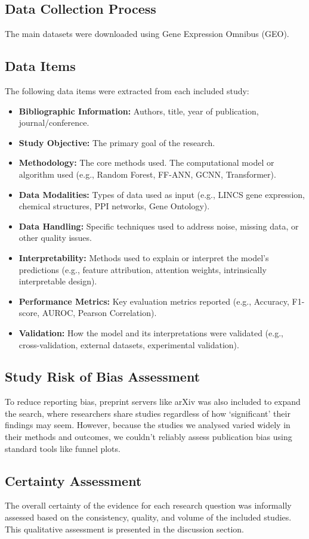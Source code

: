 \documentclass[twocolumn]{article}
\begin{document}
\subsection{Data Collection Process}
The main datasets were downloaded using Gene Expression Omnibus (GEO). 

\subsection{Data Items}
The following data items were extracted from each included study:
\begin{itemize}
    \item \textbf{Bibliographic Information: }Authors, title, year of publication, journal/conference.
    \item \textbf{Study Objective: }The primary goal of the research.
    \item \textbf{Methodology: }The core methods used. The computational model or algorithm used (e.g., Random Forest, FF-ANN, GCNN, Transformer).
    \item \textbf{Data Modalities: }Types of data used as input (e.g., LINCS gene expression, chemical structures, PPI networks, Gene Ontology).
    \item \textbf{Data Handling: }Specific techniques used to address noise, missing data, or other quality issues.
    \item \textbf{Interpretability: }Methods used to explain or interpret the model's predictions (e.g., feature attribution, attention weights, intrinsically interpretable design).
    \item \textbf{Performance Metrics: }Key evaluation metrics reported (e.g., Accuracy, F1-score, AUROC, Pearson Correlation).
    \item \textbf{Validation: }How the model and its interpretations were validated (e.g., cross-validation, external datasets, experimental validation).
\end{itemize}
\subsection{Study Risk of Bias Assessment}
To reduce reporting bias, preprint servers like arXiv was also included to expand the search, where researchers share studies regardless of how `significant' their findings may seem. However, because the studies we analysed varied widely in their methods and outcomes, we couldn’t reliably assess publication bias using standard tools like funnel plots.
\subsection{Certainty Assessment}
The overall certainty of the evidence for each research question was informally assessed based on the consistency, quality, and volume of the included studies. This qualitative assessment is presented in the discussion section.
\end{document}
